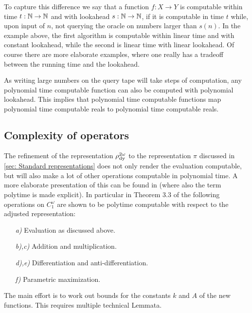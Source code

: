 To capture this difference we say that a function $f:X\to Y$ is computable within time $t:\operatorname{\mathbb{N}}\to \operatorname{\mathbb{N}}$ and with lookahead $s:\operatorname{\mathbb{N}}\to \operatorname{\mathbb{N}}$, if it is computable in time $t$ while, upon input of $n$, not querying the oracle on numbers larger than $s(n)$. In the example above, the first algorithm is computable within linear time and with constant lookahead, while the second is linear time with linear lookahead. Of course there are more elaborate examples, where one really has a tradeoff between the running time and the lookahead.

As writing large numbers on the query tape will take steps of computation, any polynomial time computable function can also be computed with polynomial lookahead. This implies that polynomial time computable functions map polynomial time computable reals to polynomial time computable reals.

\subsection{Complexity of operators}

The refinement of the representation $\rho_{\mathrm{dy}}^{2\omega}$ to the representation $\pi$ discussed in \cref{sec: Standard representations} does not only render the evaluation computable, but will also make a lot of other operations computable in polynomial time. A more elaborate presentation of this can be found in \cite{gevrey} (where also the term polytime is made explicit). In particular in Theorem 3.3 of \cite{gevrey} the following operations on $C^\omega_1$ are shown to be polytime computable with respect to the adjusted representation:
\begin{enumerate}
\item[\itshape{a)}] Evaluation as discussed above.
\item[\itshape{b)},\itshape{c)}] Addition and multiplication.
\item[\itshape{d),e)}] Differentiation and anti-differentiation.
\item[\itshape{f)}] Parametric maximization. 
\end{enumerate} The main effort is to work out bounds for the constants $k$ and $A$ of the new functions. This requires multiple technical Lemmata.